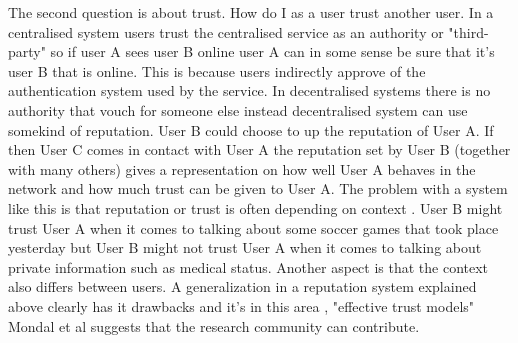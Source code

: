 The second question is about trust.
How do I as a user trust another user.
In a centralised system users trust the centralised service as an authority or "third-party" so if user A sees user B online user A can in some sense be sure that it's user B that is online.
This is because users indirectly approve of the authentication system used by the service.
In decentralised systems there is no authority that vouch for someone else instead decentralised system can use somekind of reputation.
User B could choose to up the reputation of User A.
If then User C comes in contact with User A the reputation set by User B (together with many others) gives a representation on how well User A behaves in the network and how much trust can be given to User A.
The problem with a system like this is that reputation or trust is often depending on context \cite{mondal2006}.
User B might trust User A when it comes to talking about some soccer games that took place yesterday but User B might not trust User A when it comes to talking about private information such as medical status.
Another aspect is that the context also differs between users.
A generalization in a reputation system explained above clearly has it drawbacks and it's in this area , "effective trust models" Mondal et al \cite{mondal2006} suggests that the research community can contribute.
